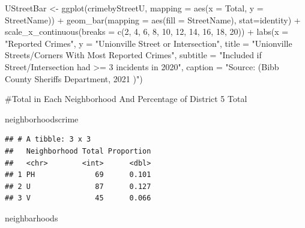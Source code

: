 \documentclass[
]{article}
\newenvironment{Shaded}{\begin{snugshade}}{\end{snugshade}}
\newcommand{\AttributeTok}[1]{\textcolor[rgb]{0.77,0.63,0.00}{#1}}
\newcommand{\DecValTok}[1]{\textcolor[rgb]{0.00,0.00,0.81}{#1}}
\newcommand{\FunctionTok}[1]{\textcolor[rgb]{0.00,0.00,0.00}{#1}}
\newcommand{\NormalTok}[1]{#1}
\newcommand{\OtherTok}[1]{\textcolor[rgb]{0.56,0.35,0.01}{#1}}
\newcommand{\SpecialCharTok}[1]{\textcolor[rgb]{0.00,0.00,0.00}{#1}}
\newcommand{\StringTok}[1]{\textcolor[rgb]{0.31,0.60,0.02}{#1}}
\begin{document}
\begin{Shaded}
\begin{Highlighting}[]
\NormalTok{UStreetBar }\OtherTok{\textless{}{-}} \FunctionTok{ggplot}\NormalTok{(crimebyStreetU, }\AttributeTok{mapping =} \FunctionTok{aes}\NormalTok{(}\AttributeTok{x =}\NormalTok{ Total, }\AttributeTok{y =}\NormalTok{ StreetName)) }\SpecialCharTok{+} 
  \FunctionTok{geom\_bar}\NormalTok{(}\AttributeTok{mapping =} \FunctionTok{aes}\NormalTok{(}\AttributeTok{fill =}\NormalTok{ StreetName), }\AttributeTok{stat=}\StringTok{\textquotesingle{}identity\textquotesingle{}}\NormalTok{)  }\SpecialCharTok{+}
  \FunctionTok{scale\_x\_continuous}\NormalTok{(}\AttributeTok{breaks =} \FunctionTok{c}\NormalTok{(}\DecValTok{2}\NormalTok{, }\DecValTok{4}\NormalTok{, }\DecValTok{6}\NormalTok{, }\DecValTok{8}\NormalTok{, }\DecValTok{10}\NormalTok{, }\DecValTok{12}\NormalTok{, }\DecValTok{14}\NormalTok{, }\DecValTok{16}\NormalTok{, }\DecValTok{18}\NormalTok{, }\DecValTok{20}\NormalTok{)) }\SpecialCharTok{+}
  \FunctionTok{labs}\NormalTok{(}\AttributeTok{x =} \StringTok{"Reported Crimes"}\NormalTok{, }\AttributeTok{y =} \StringTok{"Unionville Street or Intersection"}\NormalTok{,}
     \AttributeTok{title =} \StringTok{"Unionville Streets/Corners With Most Reported Crimes"}\NormalTok{,}
     \AttributeTok{subtitle =} \StringTok{"Included if Street/Intersection had \textgreater{}= 3 incidents in 2020"}\NormalTok{,}
     \AttributeTok{caption =} \StringTok{"Source: (Bibb County Sheriff\textquotesingle{}s Department, 2021 )"}\NormalTok{) }
\end{Highlighting}
\end{Shaded}

\#Total in Each Neighborhood And Percentage of District 5 Total

\begin{Shaded}
\begin{Highlighting}[]
\NormalTok{neighborhoodscrime}
\end{Highlighting}
\end{Shaded}

\begin{verbatim}
## # A tibble: 3 x 3
##   Neighborhood Total Proportion
##   <chr>        <int>      <dbl>
## 1 PH              69      0.101
## 2 U               87      0.127
## 3 V               45      0.066
\end{verbatim}

\begin{Shaded}
\begin{Highlighting}[]
\NormalTok{neighbarhoods}
\end{Highlighting}
\end{Shaded}
\end{document}
